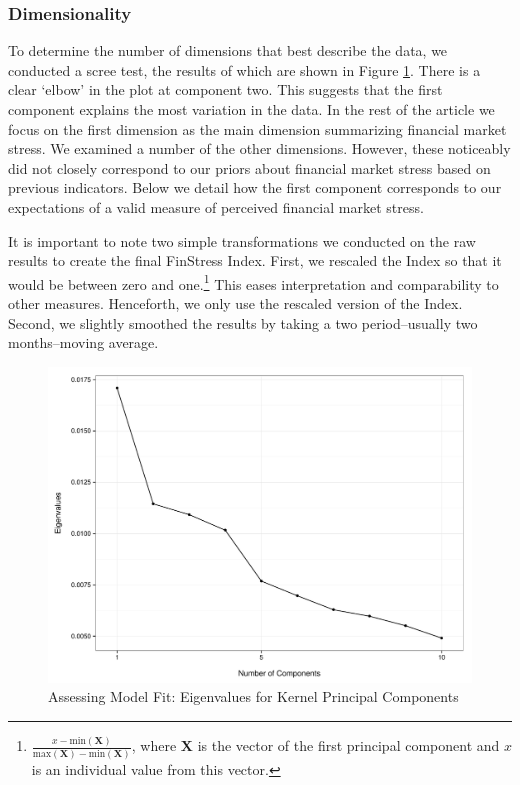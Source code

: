 \documentclass[]{article}
\begin{document}
\subsubsection{Dimensionality}\label{dimensionality}

To determine the number of dimensions that best describe the data, we conducted a scree test, the results of which are shown in Figure \ref{scree_plot}. There is a clear `elbow' in the plot at component two. This suggests that the first component explains the most variation in the data. In the rest of the article we focus on the first dimension as the main dimension summarizing financial market stress. We examined a number of the other dimensions. However, these noticeably did not closely correspond to our priors about financial market stress based on previous indicators. Below we detail how the first component corresponds to our expectations of a valid measure of perceived financial market stress.

It is important to note two simple transformations we conducted on the raw results to create the final FinStress Index. First, we rescaled the Index so that it would be between zero and one.\footnote{\(\frac{x - \mathrm{min}(\bm{X})}{\mathrm{max}(\bm{X}) - \mathrm{min}(\bm{X})}\),
  where \(\bm{X}\) is the vector of the first principal component and
  \(x\) is an individual value from this vector.} This eases
interpretation and comparability to other measures. Henceforth, we only use the rescaled version of the Index. Second, we slightly smoothed the results by taking a two period--usually two months--moving average.

\begin{figure}
    \caption{Assessing Model Fit: Eigenvalues for Kernel Principal Components}
    \label{scree_plot}
    \begin{center}
        \includegraphics[scale=0.5]{figures/scree_plot.pdf}
    \end{center}
\end{figure}
\end{document}

